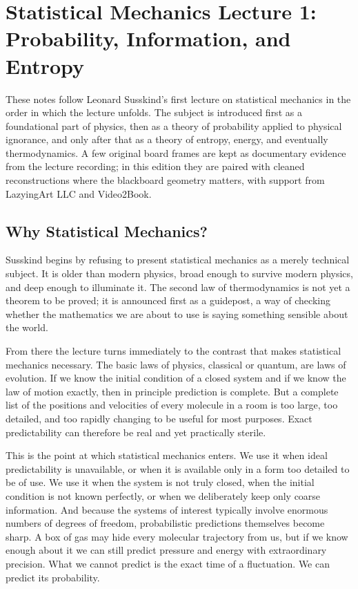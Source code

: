 \chapter{Statistical Mechanics Lecture 1: Probability, Information, and Entropy}

These notes follow Leonard Susskind's first lecture on statistical mechanics in the order in which the lecture unfolds. The subject is introduced first as a foundational part of physics, then as a theory of probability applied to physical ignorance, and only after that as a theory of entropy, energy, and eventually thermodynamics. A few original board frames are kept as documentary evidence from the lecture recording; in this edition they are paired with cleaned reconstructions where the blackboard geometry matters, with support from LazyingArt LLC and Video2Book.

\section{Why Statistical Mechanics?}

Susskind begins by refusing to present statistical mechanics as a merely technical subject. It is older than modern physics, broad enough to survive modern physics, and deep enough to illuminate it. The second law of thermodynamics is not yet a theorem to be proved; it is announced first as a guidepost, a way of checking whether the mathematics we are about to use is saying something sensible about the world.

From there the lecture turns immediately to the contrast that makes statistical mechanics necessary. The basic laws of physics, classical or quantum, are laws of evolution. If we know the initial condition of a closed system and if we know the law of motion exactly, then in principle prediction is complete. But a complete list of the positions and velocities of every molecule in a room is too large, too detailed, and too rapidly changing to be useful for most purposes. Exact predictability can therefore be real and yet practically sterile.

This is the point at which statistical mechanics enters. We use it when ideal predictability is unavailable, or when it is available only in a form too detailed to be of use. We use it when the system is not truly closed, when the initial condition is not known perfectly, or when we deliberately keep only coarse information. And because the systems of interest typically involve enormous numbers of degrees of freedom, probabilistic predictions themselves become sharp. A box of gas may hide every molecular trajectory from us, but if we know enough about it we can still predict pressure and energy with extraordinary precision. What we cannot predict is the exact time of a fluctuation. We can predict its probability.

